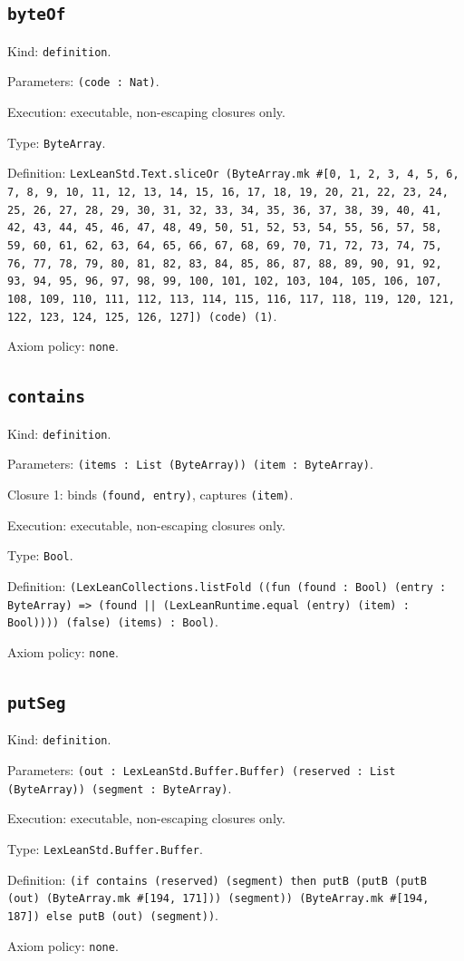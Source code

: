 \documentclass[11pt]{article}
\begin{document}
\subsection*{\texttt{byteOf}}
\noindent Kind: \texttt{definition}.\par
\noindent Parameters: \texttt{(code : Nat)}.\par
\noindent Execution: executable, non-escaping closures only.\par
\noindent Type: \texttt{ByteArray}.\par
\noindent Definition: \texttt{LexLeanStd.Text.sliceOr (ByteArray.mk \#[0, 1, 2, 3, 4, 5, 6, 7, 8, 9, 10, 11, 12, 13, 14, 15, 16, 17, 18, 19, 20, 21, 22, 23, 24, 25, 26, 27, 28, 29, 30, 31, 32, 33, 34, 35, 36, 37, 38, 39, 40, 41, 42, 43, 44, 45, 46, 47, 48, 49, 50, 51, 52, 53, 54, 55, 56, 57, 58, 59, 60, 61, 62, 63, 64, 65, 66, 67, 68, 69, 70, 71, 72, 73, 74, 75, 76, 77, 78, 79, 80, 81, 82, 83, 84, 85, 86, 87, 88, 89, 90, 91, 92, 93, 94, 95, 96, 97, 98, 99, 100, 101, 102, 103, 104, 105, 106, 107, 108, 109, 110, 111, 112, 113, 114, 115, 116, 117, 118, 119, 120, 121, 122, 123, 124, 125, 126, 127]) (code) (1)}.\par
\noindent Axiom policy: \texttt{none}.\par
\subsection*{\texttt{contains}}
\noindent Kind: \texttt{definition}.\par
\noindent Parameters: \texttt{(items : List (ByteArray)) (item : ByteArray)}.\par
\noindent Closure 1: binds \texttt{(found, entry)}, captures \texttt{(item)}.\par
\noindent Execution: executable, non-escaping closures only.\par
\noindent Type: \texttt{Bool}.\par
\noindent Definition: \texttt{(LexLeanCollections.listFold ((fun (found : Bool) (entry : ByteArray) => (found || (LexLeanRuntime.equal (entry) (item) : Bool)))) (false) (items) : Bool)}.\par
\noindent Axiom policy: \texttt{none}.\par
\subsection*{\texttt{putSeg}}
\noindent Kind: \texttt{definition}.\par
\noindent Parameters: \texttt{(out : LexLeanStd.Buffer.Buffer) (reserved : List (ByteArray)) (segment : ByteArray)}.\par
\noindent Execution: executable, non-escaping closures only.\par
\noindent Type: \texttt{LexLeanStd.Buffer.Buffer}.\par
\noindent Definition: \texttt{(if contains (reserved) (segment) then putB (putB (putB (out) (ByteArray.mk \#[194, 171])) (segment)) (ByteArray.mk \#[194, 187]) else putB (out) (segment))}.\par
\noindent Axiom policy: \texttt{none}.\par
\end{document}
